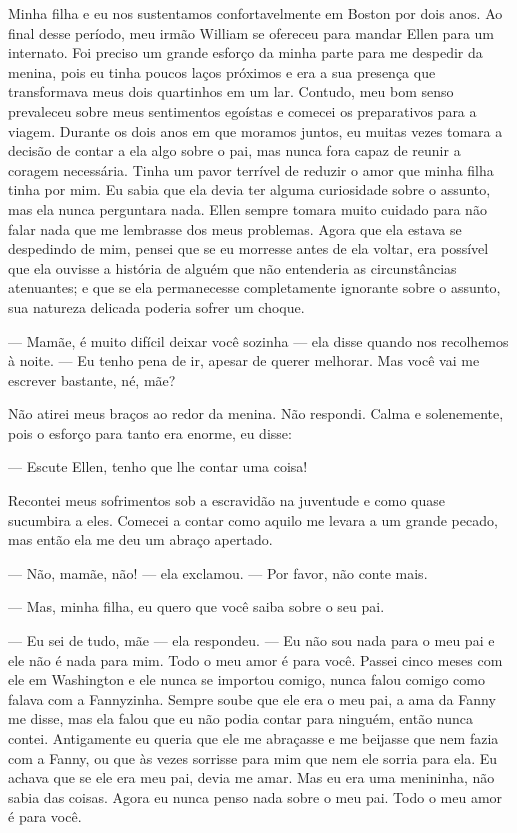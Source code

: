 Minha filha e eu nos sustentamos
confortavelmente em Boston por dois anos. Ao final desse período, meu
irmão William se ofereceu para mandar Ellen para um internato. Foi
preciso um grande esforço da minha parte para me despedir da menina,
pois eu tinha poucos laços próximos e era a sua presença que
transformava meus dois quartinhos em um lar. Contudo, meu bom senso
prevaleceu sobre meus sentimentos egoístas e comecei os preparativos
para a viagem. Durante os dois anos em que moramos juntos, eu muitas
vezes tomara a decisão de contar a ela algo sobre o pai, mas nunca fora
capaz de reunir a coragem necessária. Tinha um pavor terrível de reduzir
o amor que minha filha tinha por mim. Eu sabia que ela devia ter alguma
curiosidade sobre o assunto, mas ela nunca perguntara nada. Ellen sempre
tomara muito cuidado para não falar nada que me lembrasse dos meus
problemas. Agora que ela estava se despedindo de mim, pensei que se eu
morresse antes de ela voltar, era possível que ela ouvisse a história de
alguém que não entenderia as circunstâncias atenuantes; e que se ela
permanecesse completamente ignorante sobre o assunto, sua natureza
delicada poderia sofrer um choque.

--- Mamãe, é muito difícil deixar você
sozinha --- ela disse quando nos recolhemos à noite. --- Eu tenho pena
de ir, apesar de querer melhorar. Mas você vai me escrever bastante, né,
mãe?

Não atirei meus braços ao redor da
menina. Não respondi. Calma e solenemente, pois o esforço para tanto era
enorme, eu disse:

--- Escute Ellen, tenho que lhe contar uma coisa!

Recontei meus sofrimentos sob a escravidão na juventude e como quase
sucumbira a eles. Comecei a contar como aquilo me levara a um grande
pecado, mas então ela me deu um abraço apertado.

--- Não, mamãe, não! --- ela exclamou. --- Por favor, não conte mais.

--- Mas, minha filha, eu quero que você
saiba sobre o seu pai.

--- Eu sei de tudo, mãe --- ela
respondeu. --- Eu não sou nada para o meu pai e ele não é nada para mim.
Todo o meu amor é para você. Passei cinco meses com ele em Washington e
ele nunca se importou comigo, nunca falou comigo como falava com a
Fannyzinha. Sempre soube que ele era o meu pai, a ama da Fanny me disse,
mas ela falou que eu não podia contar para ninguém, então nunca contei.
Antigamente eu queria que ele me abraçasse e me beijasse que nem fazia
com a Fanny, ou que às vezes sorrisse para mim que nem ele sorria para
ela. Eu achava que se ele era meu pai, devia me amar. Mas eu era uma
menininha, não sabia das coisas. Agora eu nunca penso nada sobre o meu
pai. Todo o meu amor é para você.

